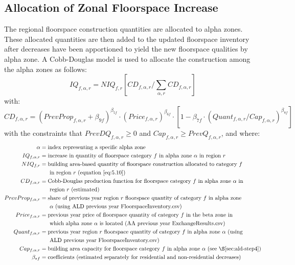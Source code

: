 \subsection{Allocation of Zonal Floorspace Increase}\label{sec:ald-step5}    %
The regional floorspace construction quantities are allocated to alpha zones. These allocated quantities are then added to the updated floorspace inventory after decreases have been apportioned to yield the new floorspace qualities by alpha zone. A Cobb-Douglas model is used to allocate the construction among the alpha zones as follows:
\begin{equation}    %
IQ_{f,\alpha,r} = NIQ_{f,r} \left[ CD_{f,\alpha,r} / \sum_{\alpha,r} CD_{f,\alpha,r} \right]
\end{equation}
\noindent with:
\begin{equation}   %
CD_{f,\alpha,r} = (PrevProp_{f,\alpha,r} + \beta_{9f})^{\beta_{5f}} \cdot (Price_{f,\alpha,r})^{\beta_{6f}} \cdot \left[ 1 -\beta_{7f} \cdot (Quant_{f,\alpha,r} / Cap_{f,\alpha,r})^{\beta_{8f}} \right]
\end{equation}
\noindent with the constraints that $PrevDQ_{f,\alpha,r} \ge 0$ and $Cap_{f,\alpha,r} \ge PrevQ_{f,\alpha,r}$, and where:
\begin{align*}
\alpha &= \text{index representing a specific alpha zone} \\
IQ_{f,\alpha,r} &= \text{increase in quantity of floorspace category $f$ in alpha zone $\alpha$ in region $r$} \\
NIQ_{f,r} &= \text{building area-based quantity of floorspace construction allocated to category $f$} \\
 &~~~~~\text{in region $r$ (equation \ref{eq:5.10})} \\
CD_{f,\alpha,r} &= \text{Cobb-Douglas production function for floorspace category $f$ in alpha zone $\alpha$ in} \\
 &~~~~~\text{region $r$ (estimated)} \\
PrevProp_{f,\alpha,r} &= \text{share of previous year region $r$ floorspace quantity of category $f$ in alpha zone} \\
 &~~~~~\text{$\alpha$ (using ALD previous year FloorspaceInventory.csv)} \\
Price_{f,\alpha,r} &= \text{previous year price of floorspace quantity of category $f$ in the beta zone in} \\
 &~~~~~\text{which alpha zone $\alpha$ is located (AA previous year ExchangeResults.csv)} \\
Quant_{f,\alpha,r} &= \text{previous year region $r$ floorspace quantity of category $f$ in alpha zone $\alpha$ (using} \\
 &~~~~~\text{ALD previous year FloorspaceInventory.csv)} \\
Cap_{f,\alpha,r} &= \text{building area capacity for floorspace category $f$ in alpha zone $\alpha$ (see \S\ref{sec:ald-step4})} \\
\beta_{*f} &= \text{coefficients (estimated separately for residential and non-residential decreases)}
\end{align*}

